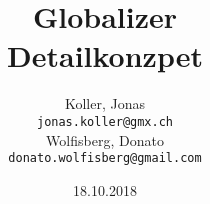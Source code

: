 \title{
	\Huge
	\textbf{Globalizer} \\
	\vspace{0.2cm}
	\LARGE
	Detailkonzpet
}

\date{18.10.2018}

\author{
	Koller, Jonas\\
	\texttt{jonas.koller@gmx.ch} \\
	Wolfisberg, Donato \\
	\texttt{donato.wolfisberg@gmail.com}
}

\pagestyle{fancy}
\fancyhf{}
\cfoot{\thedate}
\rfoot{\thepage}

\renewcommand{\headrulewidth}{1pt}
\renewcommand{\footrulewidth}{1pt}

\renewcommand{\contentsname}{Inhalt}

\begin{titlepage}

  \begin{center}
    \vspace*{-2cm}

    \thetitle

    \vspace{2cm}

    \textbf{\theauthor}

    \vspace{1.5cm}

    \thedate
  \end{center}

  \vfill

  \begin{figure}[H]
    \vspace*{-5cm}
  \end{figure}
\end{titlepage}

\newpage
{}
